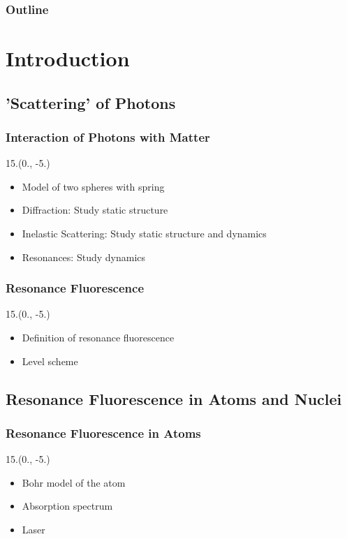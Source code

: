 \documentclass{beamer}
\begin{document}
\begin{frame}
    \titlepage
\end{frame}

\begin{frame}
    \frametitle{Outline}
    \tableofcontents
\end{frame}

\section{Introduction}

\subsection{'Scattering' of Photons}

\begin{frame}
    \frametitle{Interaction of Photons with Matter}
    \begin{textblock}{15.}(0., -5.)
        \begin{itemize}
            \item Model of two spheres with spring
            \item Diffraction: Study static structure
            \item Inelastic Scattering: Study static structure and dynamics
            \item Resonances: Study dynamics
        \end{itemize}
    \end{textblock}
\end{frame}

\begin{frame}
    \frametitle{Resonance Fluorescence}
    \begin{textblock}{15.}(0., -5.)
        \begin{itemize}
            \item Definition of resonance fluorescence
            \item Level scheme
        \end{itemize}
    \end{textblock}
\end{frame}

\subsection{Resonance Fluorescence in Atoms and Nuclei}

\begin{frame}
    \frametitle{Resonance Fluorescence in Atoms}
    \begin{textblock}{15.}(0., -5.)
        \begin{itemize}
            \item Bohr model of the atom
            \item Absorption spectrum
            \item Laser
        \end{itemize}
    \end{textblock}
\end{frame}
\end{document}
